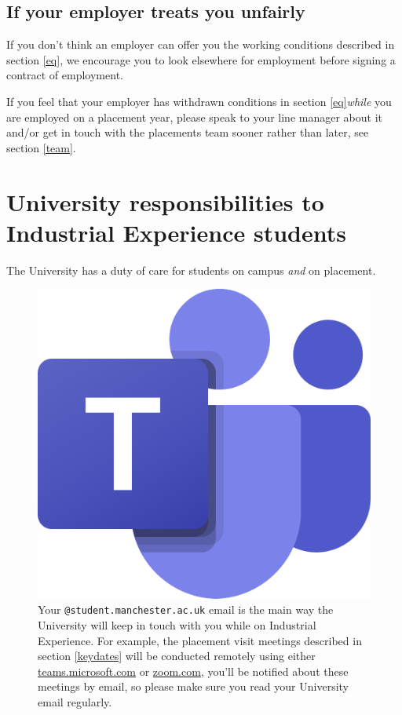 \documentclass[
]{book}
\begin{document}
\section{If your employer treats you unfairly}\label{unfair}

If you don't think an employer can offer you the working conditions described in section \ref{eq}, we encourage you to look elsewhere for employment before signing a contract of employment.

If you feel that your employer has withdrawn conditions in section \ref{eq}\emph{while} you are employed on a placement year, please speak to your line manager about it and/or get in touch with the placements team sooner rather than later, see section \ref{team}.

\chapter{University responsibilities to Industrial Experience students}\label{university}

The University has a duty of care for students on campus \emph{and} on placement.

\begin{figure}

{\centering \includegraphics[width=0.5\linewidth]{images/msteams} 

}

\caption{Your \texttt{@student.manchester.ac.uk} email is the main way the University will keep in touch with you while on Industrial Experience. For example, the placement visit meetings described in section \ref{keydates} will be conducted remotely using either \href{https://teams.microsoft.com}{teams.microsoft.com} or \href{https://www.zoom.com}{zoom.com}, you'll be notified about these meetings by email, so please make sure you read your University email regularly.}\label{fig:teams-fig}
\end{figure}
\end{document}
